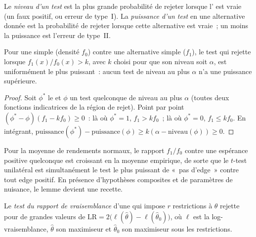 \begin{definition}\label{def:qm:testing-and-multiple-testing:size}
Le \emph{niveau d'un test} est la plus grande probabilité de rejeter lorsque l' est vraie (un faux
positif, ou erreur de type~I). La \emph{puissance d'un test} en une alternative donnée est la probabilité de rejeter
lorsque cette alternative est vraie~; un moins la puissance est l'erreur de type~II.
\end{definition}

\begin{theorem}\label{thm:qm:testing-and-multiple-testing:np}
Pour une  simple (densité $f_0$) contre une alternative simple ($f_1$), le test qui rejette lorsque $f_1(x)/f_0(x) > k$, avec $k$
choisi pour que son niveau soit $\alpha$, est uniformément le plus puissant~: aucun test de niveau au plus $\alpha$ n'a une puissance supérieure.
\end{theorem}

\begin{proof}
Soit $\phi^*$ le  et $\phi$ un test quelconque de niveau au plus $\alpha$ (toutes deux fonctions indicatrices de la
région de rejet). Point par point $(\phi^* - \phi)(f_1 - kf_0) \ge 0$~: là où $\phi^* = 1$, $f_1 > kf_0$~; là où $\phi^* = 0$, $f_1 \le kf_0$.
En intégrant, $\text{puissance}(\phi^*) - \text{puissance}(\phi) \ge k(\alpha - \text{niveau}(\phi)) \ge 0$.
\end{proof}

Pour la moyenne de rendements normaux, le rapport $f_1/f_0$ contre une espérance positive quelconque est croissant en la moyenne empirique, de sorte que le
$t$-test unilatéral est simultanément le test le plus puissant de «~pas d'edge~» contre tout edge positif. En présence d'hypothèses composites et
de paramètres de nuisance, le lemme devient une recette.

\begin{definition}\label{def:qm:testing-and-multiple-testing:lr}
Le \emph{test du rapport de vraisemblance} d'une  qui impose $r$ restrictions à $\theta$ rejette pour de grandes valeurs de
$\mathrm{LR} = 2\bigl(\ell(\hat\theta) - \ell(\hat\theta_0)\bigr)$, où $\ell$ est la log-vraisemblance, $\hat\theta$ son maximiseur et
$\hat\theta_0$ son maximiseur sous les restrictions.
\end{definition}

